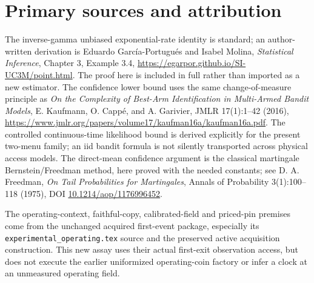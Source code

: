 \documentclass[11pt]{article}
\begin{document}
\section*{Primary sources and attribution}
The inverse-gamma unbiased exponential-rate identity is standard; an
author-written derivation is Eduardo Garc\'ia-Portugu\'es and Isabel
Molina, \emph{Statistical Inference}, Chapter 3, Example 3.4,
\url{https://egarpor.github.io/SI-UC3M/point.html}.
The proof here is included in full rather than imported as a new
estimator. The confidence lower bound uses the same change-of-measure
principle as \emph{On the Complexity of Best-Arm Identification in
Multi-Armed Bandit Models}, E. Kaufmann, O. Capp\'e, and A. Garivier,
JMLR 17(1):1--42 (2016),
\url{https://www.jmlr.org/papers/volume17/kaufman16a/kaufman16a.pdf}.
The controlled continuous-time likelihood bound is derived explicitly
for the present two-menu family; an iid bandit formula is not silently
transported across physical access models.
The direct-mean confidence argument is the classical martingale
Bernstein/Freedman method, here proved with the needed constants; see
D. A. Freedman, \emph{On Tail Probabilities for Martingales},
Annals of Probability 3(1):100--118 (1975), DOI
\href{https://doi.org/10.1214/aop/1176996452}{10.1214/aop/1176996452}.

The operating-context, faithful-copy, calibrated-field and priced-pin
premises come from the unchanged acquired first-event package,
especially its \texttt{experimental\_operating.tex} source and the
preserved active acquisition construction. This new assay uses their
actual first-exit observation access, but does not execute the earlier
uniformized operating-coin factory or infer a clock at an unmeasured
operating field.
\end{document}
